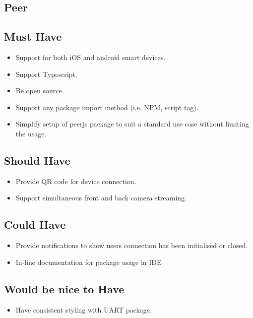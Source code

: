 \documentclass{l4proj}
\begin{document}
\begin{appendices}

\section{Peer}
\subsection{Must Have}
\begin{itemize}
    \item Support for both iOS and android smart devices.
    \item Support Typescript.
    \item Be open source.
    \item Support any package import method (i.e. NPM, script tag).
    \item Simplify setup of peerjs package to suit a standard use case without limiting the usage.

\end{itemize}
\subsection{Should Have}
\begin{itemize}
    \item Provide QR code for device connection.
    \item Support simultaneous front and back camera streaming.

\end{itemize}
\subsection{Could Have}
\begin{itemize}
    \item Provide notifications to show users connection has been initialised or closed.
    \item In-line documentation for package usage in IDE

\end{itemize}
\subsection{Would be nice to Have}
\begin{itemize}
    \item Have consistent styling with UART package.
\end{itemize}



\end{appendices}
\end{document}
